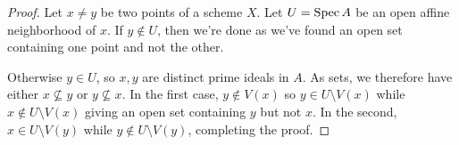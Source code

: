 \begin{proof}
	Let $x \neq y$ be two points of a scheme $X$. Let $U = \operatorname{Spec} A$ be an open affine neighborhood of $x$. If $y \notin U$, then we're done as we've found an open set containing one point and not the other.
	
	Otherwise $y \in U$, so $x,y$ are distinct prime ideals in $A$. As sets, we therefore have either $x \not\subseteq y$ or $y \not\subseteq x$. In the first case, $y \notin V(x)$ so $y \in U \setminus V(x)$ while $x \notin U \setminus V(x)$ giving an open set containing $y$ but not $x$. In the second, $x \in U \setminus V(y)$ while $y \notin U \setminus V(y)$, completing the proof.
\end{proof}
